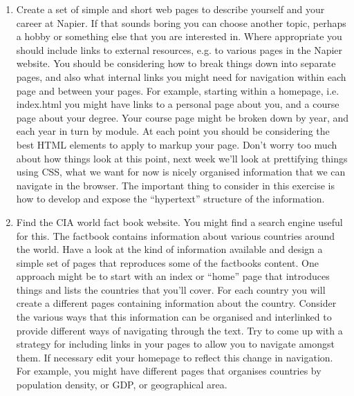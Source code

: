 \documentclass[10pt, a4paper, twosize]{article}
\begin{document}
\begin{enumerate}
\item Create a set of simple and short web pages to describe yourself and your career at Napier. If that sounds boring you can choose another topic, perhaps a hobby or something else that you are interested in. Where appropriate you should include links to external resources, e.g. to various pages in the Napier website. You should be considering how to break things down into separate pages, and also what internal links you might need for navigation within each page and between your pages. For example, starting within a homepage, i.e. index.html you might have links to a personal page about you, and a course page about your degree. Your course page might be broken down by year, and each year in turn by module. At each point you should be considering the best HTML elements to apply to markup your page. Don't worry too much about how things look at this point, next week we'll look at prettifying things using CSS, what we want for now is nicely organised information that we can navigate in the browser. The important thing to consider in this exercise is how to develop and expose the ``hypertext'' structure of the information.
\item Find the CIA world fact book website. You might find a search engine useful for this. The factbook contains information about various countries around the world. Have a look at the kind of information available and design a simple set of pages that reproduces some of the factbooks content. One approach might be to start with an index or ``home'' page that introduces things and lists the countries that you'll cover. For each country you will create a different pages containing information about the country. Consider the various ways that this information can be organised and interlinked to provide different ways of navigating through the text. Try to come up with a strategy for including links in your pages to allow you to navigate amongst them. If necessary edit your homepage to reflect this change in navigation. For example, you might have different pages that organises countries by population density, or GDP, or geographical area.

\end{enumerate}
\end{document}
